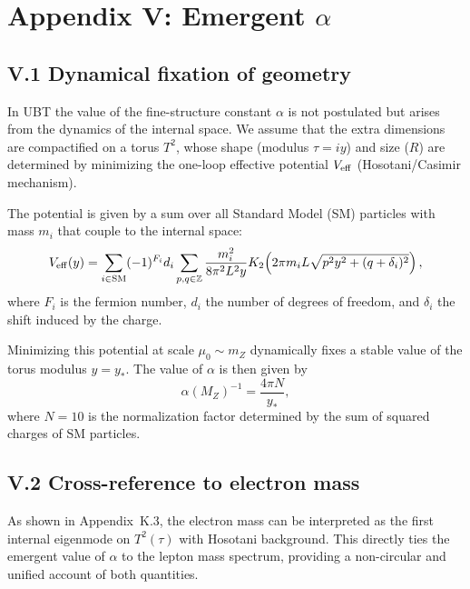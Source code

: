 
\appendix
\section*{Appendix V: Emergent $\alpha$}

\subsection*{V.1 Dynamical fixation of geometry}
In UBT the value of the fine-structure constant $\alpha$ is not postulated 
but arises from the dynamics of the internal space. We assume that the 
extra dimensions are compactified on a torus $T^2$, whose shape (modulus 
$\tau=i y$) and size ($R$) are determined by minimizing the one-loop 
effective potential $V_{\rm eff}$ (Hosotani/Casimir mechanism).

The potential is given by a sum over all Standard Model (SM) particles 
with mass $m_i$ that couple to the internal space:
\begin{equation}
V_{\rm eff}(y) = \sum_{i \in \text{SM}} (-1)^{F_i} d_i 
  \sum_{p,q \in \mathbb{Z}} \frac{m_i^2}{8\pi^2 L^2 y} 
  K_2\!\left(2\pi m_i L \sqrt{p^2 y^2 + (q+\delta_i)^2}\right),
\end{equation}
where $F_i$ is the fermion number, $d_i$ the number of degrees of freedom, 
and $\delta_i$ the shift induced by the charge.

Minimizing this potential at scale $\mu_0\sim m_Z$ dynamically fixes 
a stable value of the torus modulus $y=y_\ast$. The value of $\alpha$ 
is then given by
\begin{equation}
\alpha(M_Z)^{-1} = \frac{4\pi N}{y_\ast},
\end{equation}
where $N=10$ is the normalization factor determined by the sum of squared 
charges of SM particles.

\subsection*{V.2 Cross-reference to electron mass}
As shown in Appendix~K.3, the electron mass can be interpreted as the first 
internal eigenmode on $T^2(\tau)$ with Hosotani background. This directly ties 
the emergent value of $\alpha$ to the lepton mass spectrum, providing a 
non-circular and unified account of both quantities.

